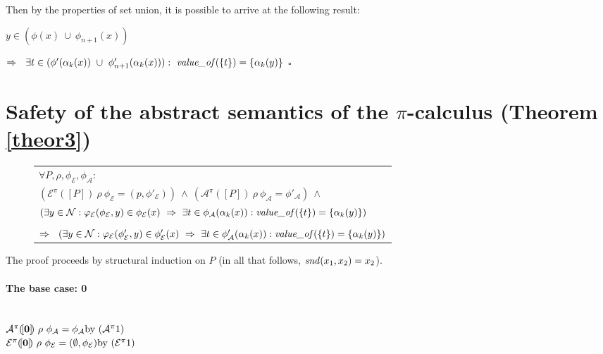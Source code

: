 \documentclass[10pt,a4paper,final,oneside,fleqn]{book}
\begin{document}
\noindent
Then by the properties of set union, it is possible to arrive at the following result:

\noindent
$y\in(\phi(x)~\cup~\phi_{n+1}(x))$\vspace{5mm}

\noindent
$\Rightarrow~~\exists t\in(\phi'(\alpha_k(x))~\cup~\phi'_{n+1}(\alpha_k(x))):~\mbox{{\itshape value\_of\/}}(\{t\})=\{\alpha_k(y)\}$
\vfill
\noindent
$\square$
\newpage
\section{Safety of the abstract semantics of the $\pi$-calculus (Theorem \ref{theor3})\label{apptheor3}}
\begin{figure*}[bht]
\begin{center}
\begin{tabular}{|l|}\hline
$\forall P, \rho, \phi_\mathcal{E}, \phi_\mathcal{A}:$\\
$(\mathcal{E}^\pi(\![P]\!)~\rho~\phi_\mathcal{E}=(p,\phi'_\mathcal{E}))~\wedge~(\mathcal{A}^\pi(\![P]\!)~\rho~\phi_\mathcal{A}=\phi'_\mathcal{A})~\wedge$\\
$(\exists y\in\mathcal{N}:\varphi_\mathcal{E}(\phi_\mathcal{E},y)\in\phi_\mathcal{E}(x)~\Rightarrow~\exists t\in\phi_\mathcal{A}(\alpha_k(x)):\mbox{{\itshape value\_of\/}}(\{t\})=\{\alpha_k(y)\})$\\\\

\noindent
$\Rightarrow~~(\exists y\in\mathcal{N}:\varphi_\mathcal{E}(\phi'_\mathcal{E},y)\in\phi'_\mathcal{E}(x)~\Rightarrow~\exists t\in\phi'_\mathcal{A}(\alpha_k(x)):\mbox{{\itshape value\_of\/}}(\{t\})=\{\alpha_k(y)\})$\\
\hline
\end{tabular}
\end{center}
\end{figure*}

\noindent
The proof proceeds by structural induction on $P$ (in all that follows, $\mbox{{\itshape snd\/}}(x_1,x_2)=x_2$).
\paragraph{The base case: 0}
$ $\\
$\mathcal{A}^\pi(\![{\bf 0}]\!)~\rho~\phi_\mathcal{A}=\phi_\mathcal{A}\hfill\mbox{by }(\mathcal{A}^{\pi}1)$\\
$\mathcal{E}^\pi(\![{\bf 0}]\!)~\rho~\phi_\mathcal{E}=(\emptyset,\phi_\mathcal{E})\hfill\mbox{by }(\mathcal{E}^{\pi}1)$\vspace{5mm}
\end{document}

